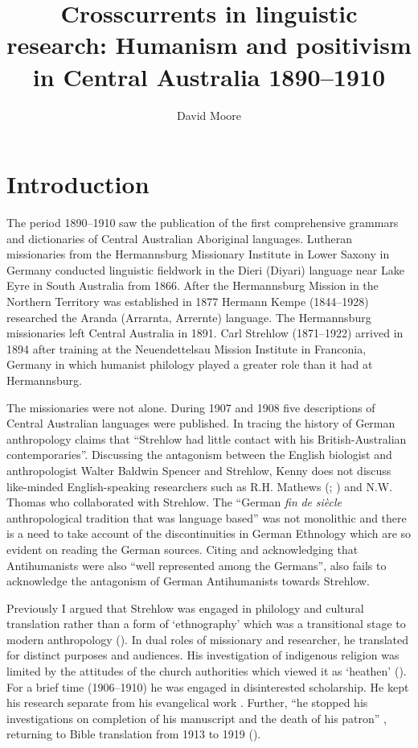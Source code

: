 \documentclass[output=paper]{langsci/langscibook}
\author{David Moore\affiliation{University of Western Australia}\orcid{}}
\title{Crosscurrents in linguistic research: Humanism and positivism in Central Australia 1890--1910}
\begin{document}
\maketitle

\section{Introduction} 

 The period 1890--1910 saw the publication of the first comprehensive grammars and dictionaries of Central  Australian Aboriginal languages. Lutheran missionaries from the Hermannsburg Missionary Institute in Lower Saxony in Germany conducted linguistic fieldwork in the Dieri (Diyari) language near Lake Eyre in South Australia from 1866. After the Hermannsburg Mission in the Northern Territory was established in 1877 Hermann Kempe (1844--1928) researched the Aranda (Arrarnta, Arrernte) language. The Hermannsburg missionaries left Central Australia in 1891. Carl Strehlow (1871--1922) arrived in 1894 after training at the Neuendettelsau Mission Institute in Franconia, Germany in which humanist philology played a greater role than it had at Hermannsburg.
 
 The missionaries were not alone. During 1907 and 1908 five descriptions of Central Australian languages were published. In tracing the history of German anthropology \citet[51]{kenny_arandas_2013} claims that “Strehlow had little contact with his British-Australian contemporaries”. Discussing the antagonism between the English biologist and anthropologist Walter Baldwin Spencer and Strehlow, Kenny does not discuss like-minded English-speaking researchers such as R.H. Mathews (\citealt{mathews_arranda_1907}; \citealt{thomas_culture_2007}) and N.W. Thomas who collaborated with Strehlow. The “German \textit{fin} \textit{de} \textit{siècle} anthropological tradition that was language based” \citep[99]{kenny_arandas_2013} was not monolithic and there is a need to take account of the discontinuities in German Ethnology which are so evident on reading the German sources. Citing \citet{monteath_globalising_2013} and acknowledging that Antihumanists were also “well represented among the Germans”, \citet[228]{kenny_arandas_2013} also fails to acknowledge the antagonism of German Antihumanists towards Strehlow.
 
 Previously I argued that Strehlow was engaged in philology and cultural translation rather than a form of ‘ethnography’ which was a transitional stage to modern anthropology (\citealt[336]{harding_indigenous_2018}). In dual roles of missionary and researcher, he translated for distinct purposes and audiences. His investigation of indigenous religion was limited by the attitudes of the church authorities which viewed it as ‘heathen’ (\citealt[338]{harding_indigenous_2018}).  For a brief time (1906--1910) he was engaged in disinterested scholarship. He kept his research separate from his evangelical work \citep[232]{brock_evangelism_2017}. Further, “he stopped his investigations on completion of his manuscript and the death of his patron” \citep[236]{brock_evangelism_2017}, returning to Bible translation from 1913 to 1919 (\citealt[336]{harding_indigenous_2018}).
 
\end{document}
